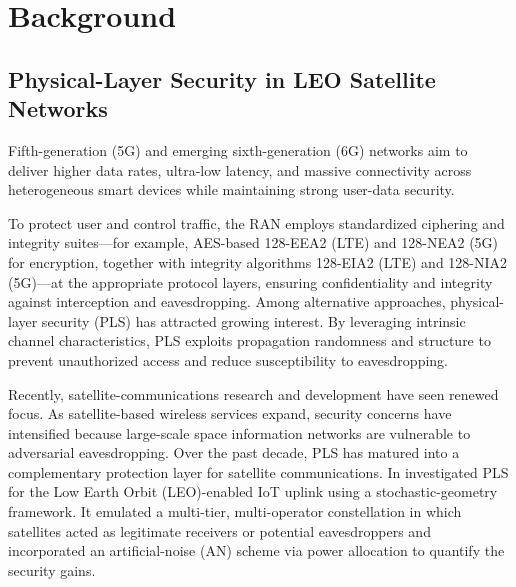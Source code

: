 \documentclass[conference]{IEEEtran}
\begin{document}
\section{Background} \label{sec2}

\subsection{Physical-Layer Security in LEO Satellite Networks} \label{sec2.1}

Fifth-generation (5G) and emerging sixth-generation (6G) networks aim to deliver higher data rates, ultra-low latency, and massive connectivity across heterogeneous smart devices while maintaining strong user-data security\cite{SPark:21}.

To protect user and control traffic, the RAN employs standardized ciphering and integrity suites—for example, AES-based 128-EEA2 (LTE) and 128-NEA2 (5G) for encryption, together with integrity algorithms 128-EIA2 (LTE) and 128-NIA2 (5G)—at the appropriate protocol layers, ensuring confidentiality and integrity against interception and eavesdropping\cite{PScalise:24}. Among alternative approaches, physical-layer security (PLS) has attracted growing interest. By leveraging intrinsic channel characteristics, PLS exploits propagation randomness and structure to prevent unauthorized access and reduce susceptibility to eavesdropping\cite{ASanenga:20}.

Recently, satellite-communications research and development have seen renewed focus. As satellite-based wireless services expand, security concerns have intensified because large-scale space information networks are vulnerable to adversarial eavesdropping. Over the past decade, PLS has matured into a complementary protection layer for satellite communications\cite{BLi:20}. In\cite{Talgat:24} investigated PLS for the Low Earth Orbit (LEO)-enabled IoT uplink using a stochastic-geometry framework. It emulated a multi-tier, multi-operator constellation in which satellites acted as legitimate receivers or potential eavesdroppers and incorporated an artificial-noise (AN) scheme via power allocation to quantify the security gains.
\end{document}
